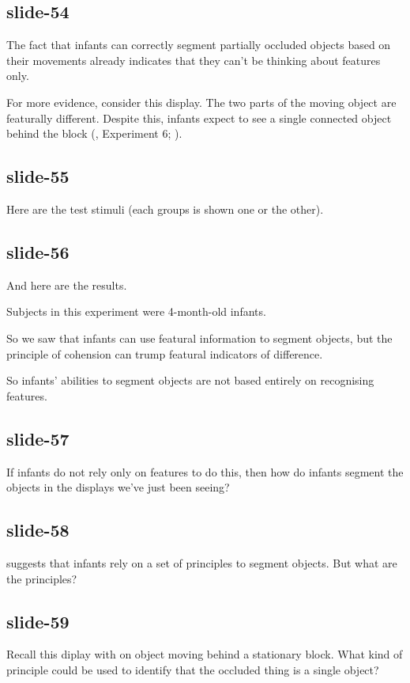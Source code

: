 \documentclass[12pt,\papersize]{extarticle}
\begin{document}
\subsection{slide-54}
The fact that infants can correctly segment partially occluded objects based on their movements 
already indicates that they can't be thinking about features only.
 
For more evidence, consider this display.
The two parts of the moving object are featurally different.
Despite this, infants expect to see a single connected object behind the block 
(\citealp{kellman:1983_perception}, Experiment 6; \citealp{Spelke:1990jn}).
 
\subsection{slide-55}
Here are the test stimuli (each groups is shown one or the other).
 
\subsection{slide-56}
And here are the results.
 
Subjects in this experiment were 4-month-old infants.
 
So we saw that infants can use featural information to segment objects, 
but the principle of cohension can trump featural indicators of difference.
 
So infants' abilities to segment objects are not based entirely on recognising features.
 
\subsection{slide-57}
If infants do not rely only on features to do this, then
how do infants segment the objects in the displays we've just been seeing?
 
\subsection{slide-58}
\citet{Spelke:1990jn} suggests that infants rely on a set of principles to segment objects.
But what are the principles?
 
\subsection{slide-59}
Recall this diplay with on object moving behind a stationary block.
What kind of principle could be used to identify that the occluded thing is a single object?
 
\end{document}
